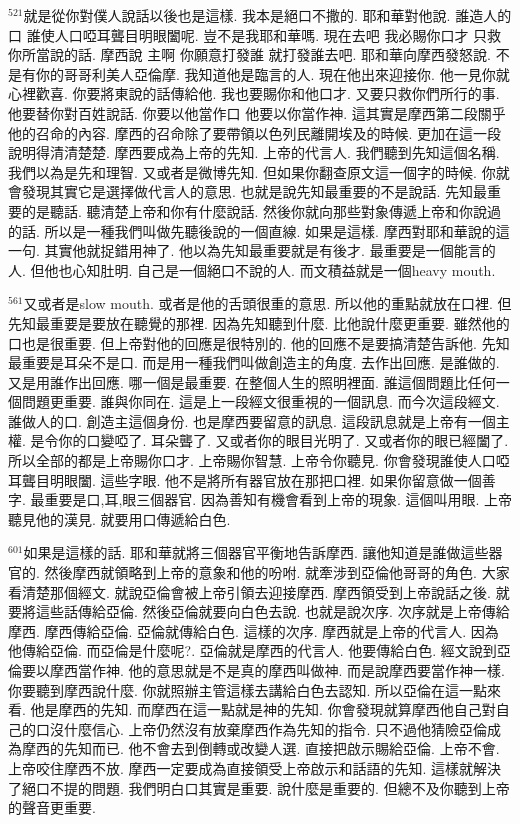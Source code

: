 \documentclass{book}
\begin{document}
$^{521}$就是從你對僕人說話以後也是這樣.
我本是絕口不撒的.
耶和華對他說.
誰造人的口 誰使人口啞耳聾目明眼闔呢.
豈不是我耶和華嗎.
現在去吧 我必賜你口才 只救你所當說的話.
摩西說 主啊 你願意打發誰 就打發誰去吧.
耶和華向摩西發怒說.
不是有你的哥哥利美人亞倫摩.
我知道他是臨言的人.
現在他出來迎接你.
他一見你就心裡歡喜.
你要將東說的話傳給他.
我也要賜你和他口才.
又要只救你們所行的事.
他要替你對百姓說話.
你要以他當作口 他要以你當作神.
這其實是摩西第二段關乎他的召命的內容.
摩西的召命除了要帶領以色列民離開埃及的時候.
更加在這一段說明得清清楚楚.
摩西要成為上帝的先知.
上帝的代言人.
我們聽到先知這個名稱.
我們以為是先和理智.
又或者是微博先知.
但如果你翻查原文這一個字的時候.
你就會發現其實它是選擇做代言人的意思.
也就是說先知最重要的不是說話.
先知最重要的是聽話.
聽清楚上帝和你有什麼說話.
然後你就向那些對象傳遞上帝和你說過的話.
所以是一種我們叫做先聽後說的一個直線.
如果是這樣.
摩西對耶和華說的這一句.
其實他就捉錯用神了.
他以為先知最重要就是有後才.
最重要是一個能言的人.
但他也心知肚明.
自己是一個絕口不說的人.
而文積益就是一個heavy mouth.

$^{561}$又或者是slow mouth.
或者是他的舌頭很重的意思.
所以他的重點就放在口裡.
但先知最重要是要放在聽覺的那裡.
因為先知聽到什麼.
比他說什麼更重要.
雖然他的口也是很重要.
但上帝對他的回應是很特別的.
他的回應不是要搞清楚告訴他.
先知最重要是耳朵不是口.
而是用一種我們叫做創造主的角度.
去作出回應.
是誰做的.
又是用誰作出回應.
哪一個是最重要.
在整個人生的照明裡面.
誰這個問題比任何一個問題更重要.
誰與你同在.
這是上一段經文很重視的一個訊息.
而今次這段經文.
誰做人的口.
創造主這個身份.
也是摩西要留意的訊息.
這段訊息就是上帝有一個主權.
是令你的口變啞了.
耳朵聾了.
又或者你的眼目光明了.
又或者你的眼已經闔了.
所以全部的都是上帝賜你口才.
上帝賜你智慧.
上帝令你聽見.
你會發現誰使人口啞耳聾目明眼闔.
這些字眼.
他不是將所有器官放在那把口裡.
如果你留意做一個善字.
最重要是口,耳,眼三個器官.
因為善知有機會看到上帝的現象.
這個叫用眼.
上帝聽見他的漢見.
就要用口傳遞給白色.

$^{601}$如果是這樣的話.
耶和華就將三個器官平衡地告訴摩西.
讓他知道是誰做這些器官的.
然後摩西就領略到上帝的意象和他的吩咐.
就牽涉到亞倫他哥哥的角色.
大家看清楚那個經文.
就說亞倫會被上帝引領去迎接摩西.
摩西領受到上帝說話之後.
就要將這些話傳給亞倫.
然後亞倫就要向白色去說.
也就是說次序.
次序就是上帝傳給摩西.
摩西傳給亞倫.
亞倫就傳給白色.
這樣的次序.
摩西就是上帝的代言人.
因為他傳給亞倫.
而亞倫是什麼呢?.
亞倫就是摩西的代言人.
他要傳給白色.
經文說到亞倫要以摩西當作神.
他的意思就是不是真的摩西叫做神.
而是說摩西要當作神一樣.
你要聽到摩西說什麼.
你就照辦主管這樣去講給白色去認知.
所以亞倫在這一點來看.
他是摩西的先知.
而摩西在這一點就是神的先知.
你會發現就算摩西他自己對自己的口沒什麼信心.
上帝仍然沒有放棄摩西作為先知的指令.
只不過他猜險亞倫成為摩西的先知而已.
他不會去到倒轉或改變人選.
直接把啟示賜給亞倫.
上帝不會.
上帝咬住摩西不放.
摩西一定要成為直接領受上帝啟示和話語的先知.
這樣就解決了絕口不提的問題.
我們明白口其實是重要.
說什麼是重要的.
但總不及你聽到上帝的聲音更重要.
\end{document}
